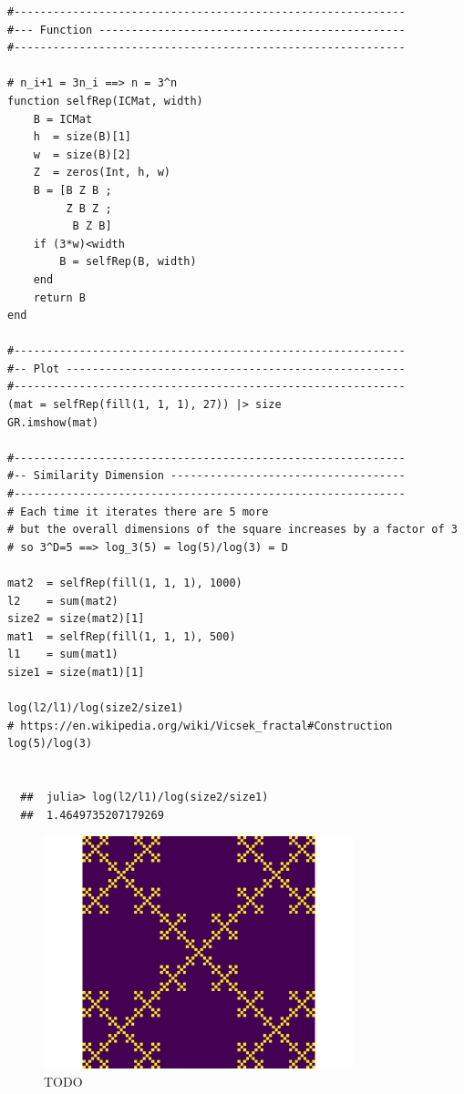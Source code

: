 \documentclass[11pt]{article}
\begin{document}
\begin{listing}[htbp]
\begin{verbatim}
#------------------------------------------------------------
#--- Function -----------------------------------------------
#------------------------------------------------------------

# n_i+1 = 3n_i ==> n = 3^n
function selfRep(ICMat, width)
    B = ICMat
    h  = size(B)[1]
    w  = size(B)[2]
    Z  = zeros(Int, h, w)
    B = [B Z B ;
         Z B Z ;
          B Z B]
    if (3*w)<width
        B = selfRep(B, width)
    end
    return B
end

#------------------------------------------------------------
#-- Plot ----------------------------------------------------
#------------------------------------------------------------
(mat = selfRep(fill(1, 1, 1), 27)) |> size
GR.imshow(mat)

#------------------------------------------------------------
#-- Similarity Dimension ------------------------------------
#------------------------------------------------------------
# Each time it iterates there are 5 more
# but the overall dimensions of the square increases by a factor of 3
# so 3^D=5 ==> log_3(5) = log(5)/log(3) = D

mat2  = selfRep(fill(1, 1, 1), 1000)
l2    = sum(mat2)
size2 = size(mat2)[1]
mat1  = selfRep(fill(1, 1, 1), 500)
l1    = sum(mat1)
size1 = size(mat1)[1]

log(l2/l1)/log(size2/size1)
# https://en.wikipedia.org/wiki/Vicsek_fractal#Construction
log(5)/log(3)


  ##  julia> log(l2/l1)/log(size2/size1)
  ##  1.4649735207179269
\end{verbatim}
\label{vicsek-matrix-gen}
\end{listing}

\begin{figure}[htbp]
\centering
\includegraphics[width=9cm]{media/Vicsek-Fractal.png}
\caption{\label{vicsek-fractal-julia}TODO}
\end{figure}
\end{document}
